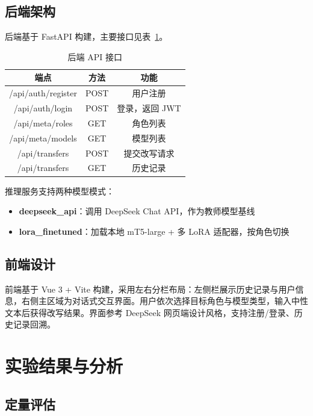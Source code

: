 \documentclass[12pt,a4paper]{article}
\begin{document}
\subsection{后端架构}

后端基于 FastAPI 构建，主要接口见表~\ref{tab:api}。

\begin{table}[H]
\centering
\caption{后端 API 接口}
\label{tab:api}
\begin{tabular}{c|c|c}
\toprule
端点 & 方法 & 功能 \\
\midrule
/api/auth/register & POST & 用户注册 \\
/api/auth/login    & POST & 登录，返回 JWT \\
/api/meta/roles    & GET  & 角色列表 \\
/api/meta/models   & GET  & 模型列表 \\
/api/transfers     & POST & 提交改写请求 \\
/api/transfers     & GET  & 历史记录 \\
\bottomrule
\end{tabular}
\end{table}

推理服务支持两种模型模式：

\begin{itemize}[leftmargin=2em]
    \item \textbf{deepseek\_api}：调用 DeepSeek Chat API，作为教师模型基线
    \item \textbf{lora\_finetuned}：加载本地 mT5-large + 多 LoRA 适配器，按角色切换
\end{itemize}

\subsection{前端设计}

前端基于 Vue 3 + Vite 构建，采用左右分栏布局：左侧栏展示历史记录与用户信息，右侧主区域为对话式交互界面。用户依次选择目标角色与模型类型，输入中性文本后获得改写结果。界面参考 DeepSeek 网页端设计风格，支持注册/登录、历史记录回溯。

\section{实验结果与分析}

\subsection{定量评估}
\end{document}
